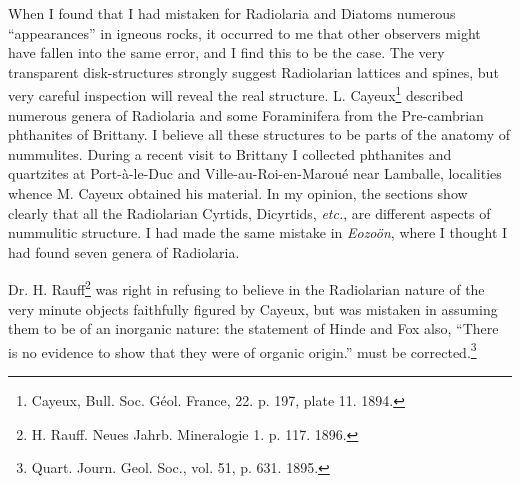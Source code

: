 \documentclass[a4paper, 12pt, oneside]{article}
\begin{document}
When I found that I had mistaken for Radiolaria and Diatoms numerous ``appearances'' in igneous rocks, it occurred to me that other observers might have fallen into the same error, and I find this to be the case. The very transparent disk-structures strongly suggest Radiolarian lattices and spines, but very careful inspection will reveal the real structure. L. Cayeux\footnote{Cayeux, Bull. Soc. Géol. France, 22. p. 197, plate 11. 1894.} described numerous genera of Radiolaria and some Foraminifera from the Pre-cambrian phthanites of Brittany. I believe all these structures to be parts of the anatomy of nummulites. During a recent visit to Brittany I collected phthanites and quartzites at Port-à-le-Duc and Ville-au-Roi-en-Maroué near Lamballe, localities whence M. Cayeux obtained his material. In my opinion, the sections show clearly that all the Radiolarian Cyrtids, Dicyrtids, \emph{etc.}, are different aspects of nummulitic structure. I had made the same mistake in \emph{Eozoön}, where I thought I had found seven genera of Radiolaria.

Dr. H. Rauff\footnote{H. Rauff. Neues Jahrb. Mineralogie 1. p. 117. 1896.} was right in refusing to believe in the Radiolarian nature of the very minute objects faithfully figured by Cayeux, but was mistaken in assuming them to be of an inorganic nature: the statement of Hinde and Fox also, ``There is no evidence to show that they were of organic origin.'' must be corrected.\footnote{Quart. Journ. Geol. Soc., vol. 51, p. 631. 1895.}
\end{document}
